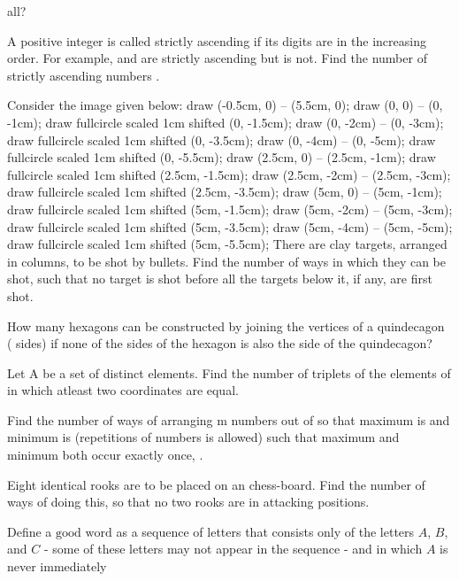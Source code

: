   all?
\item A positive integer  is called strictly ascending if its digits are in the increasing order. For
  example,  and  are strictly ascending but  is not. Find the number of strictly
  ascending numbers .
\item Consider the image given below:
  \startplacefigure[location={left,none}]
    \startMPcode
      draw (-0.5cm, 0) -- (5.5cm, 0);
      draw (0, 0) -- (0, -1cm);
      draw fullcircle scaled 1cm shifted (0, -1.5cm);
      draw (0, -2cm) -- (0, -3cm);
      draw fullcircle scaled 1cm shifted (0, -3.5cm);
      draw (0, -4cm) -- (0, -5cm);
      draw fullcircle scaled 1cm shifted (0, -5.5cm);
      draw (2.5cm, 0) -- (2.5cm, -1cm);
      draw fullcircle scaled 1cm shifted (2.5cm, -1.5cm);
      draw (2.5cm, -2cm) -- (2.5cm, -3cm);
      draw fullcircle scaled 1cm shifted (2.5cm, -3.5cm);
      draw (5cm, 0) -- (5cm, -1cm);
      draw fullcircle scaled 1cm shifted (5cm, -1.5cm);
      draw (5cm, -2cm) -- (5cm, -3cm);
      draw fullcircle scaled 1cm shifted (5cm, -3.5cm);
      draw (5cm, -4cm) -- (5cm, -5cm);
      draw fullcircle scaled 1cm shifted (5cm, -5.5cm);
    \stopMPcode
  \stopplacefigure
  There are  clay targets, arranged in  columns, to be shot by  bullets. Find the number of
  ways in which they can be shot, such that no target is shot before all the targets below it, if any, are
  first shot.
  \vskip 4cm
\item How many hexagons can be constructed by joining the vertices of a quindecagon ( sides) if none
  of the sides of the hexagon is also the side of the quindecagon?
\item Let A be a set of  distinct elements. Find the number of triplets  of the
  elements of  in which atleast two coordinates are equal.
\item Find the number of ways of arranging m numbers out of  so that maximum is  and minimum is  (repetitions of numbers is allowed) such that maximum and minimum both occur
  exactly once, .
\item Eight identical rooks are to be placed on an  chess-board. Find the number of ways of
  doing this, so that no two rooks are in attacking positions.
\item Define a $\text{good~word}$ as a sequence of letters that consists only of the letters $A$, $B$, and
  $C$ - some of these letters may not appear in the sequence - and in which $A$ is never immediately
